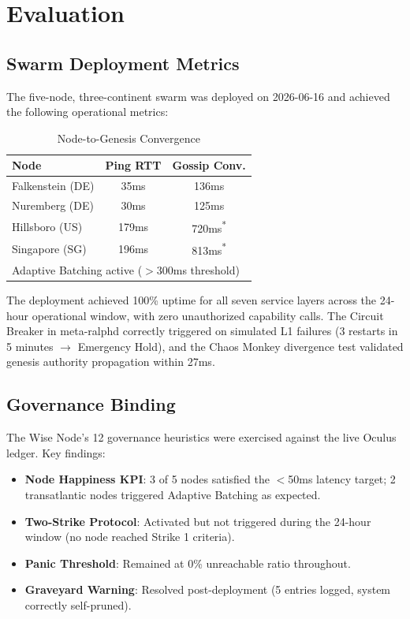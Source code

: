 \documentclass[conference]{IEEEtran}
\begin{document}
\section{Evaluation}

\subsection{Swarm Deployment Metrics}

The five-node, three-continent swarm was deployed on 2026-06-16 and achieved
the following operational metrics:

\begin{table}[h]
\centering
\caption{Node-to-Genesis Convergence}
\begin{tabular}{|l|c|c|}
\hline
\textbf{Node} & \textbf{Ping RTT} & \textbf{Gossip Conv.} \\
\hline
Falkenstein (DE) & 35ms & 136ms \\
Nuremberg (DE) & 30ms & 125ms \\
Hillsboro (US) & 179ms & 720ms\textsuperscript{*} \\
Singapore (SG) & 196ms & 813ms\textsuperscript{*} \\
\hline
\multicolumn{3}{l}{\small *Adaptive Batching active ($>$300ms threshold)} \\
\end{tabular}
\end{table}

The deployment achieved 100\% uptime for all seven service layers across the
24-hour operational window, with zero unauthorized capability calls. The
Circuit Breaker in meta-ralphd correctly triggered on simulated L1 failures
(3 restarts in 5 minutes $\rightarrow$ Emergency Hold), and the Chaos Monkey
divergence test validated genesis authority propagation within 27ms.

\subsection{Governance Binding}

The Wise Node's 12 governance heuristics were exercised against the live
Oculus ledger. Key findings:

\begin{itemize}
\item \textbf{Node Happiness KPI}: 3 of 5 nodes satisfied the
$<$50ms latency target; 2 transatlantic nodes triggered Adaptive Batching
as expected.
\item \textbf{Two-Strike Protocol}: Activated but not triggered during the
24-hour window (no node reached Strike 1 criteria).
\item \textbf{Panic Threshold}: Remained at 0\% unreachable ratio throughout.
\item \textbf{Graveyard Warning}: Resolved post-deployment (5 entries logged,
system correctly self-pruned).
\end{itemize}
\end{document}
